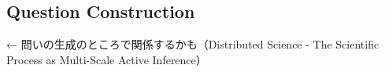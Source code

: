 





\subsection{Question Construction}
\label{section-question-construction}

← 問いの生成のところで関係するかも（Distributed Science - The Scientific Process as Multi-Scale Active Inference）

